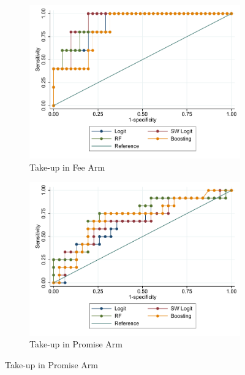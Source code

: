 \vspace{.1in}
\begin{figure}[H]
    \caption{Out of sample ROC curve}
    \label{roc_curve}
    \begin{center}
    \begin{subfigure}{0.45\textwidth}
        \caption{Take-up in Fee Arm}
        \centering
        \includegraphics[width=\textwidth]{Figuras/Boost/ROC_curve_outsample_pago_frec_vol_fee.pdf}
    \end{subfigure}
    \begin{subfigure}{0.45\textwidth}
        \caption{Take-up in Promise Arm}
        \centering
        \includegraphics[width=\textwidth]{Figuras/Boost/ROC_curve_outsample_pago_frec_vol_promise.pdf}
    \end{subfigure}
    \end{center}
     \scriptsize 
\end{figure}




